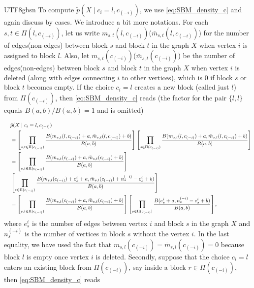 \documentclass[12pt]{report}
\newcommand\tab[1][1cm]{\hspace*{#1}}
\newcommand{\squared}[1]{\left [ #1 \right ]}
\theoremstyle{plain}
\theoremstyle{definition}
\begin{document}
\begin{CJK*}{UTF8}{gbsn}
To compute $\tilde{p}(X \mid c_i = l,c_{(-i)})$, we use 
\eqref{eq:SBM_density_c} and again discuss by cases.
We introduce a bit more notations. 
For each $s, t \in \Pi(l, c_{(-i)})$,
let us write $m_{s,t}(l, c_{(-i)})$($\bar{m}_{s,t}(l, c_{(-i)})$)
for the number of edges(non-edges) between block $s$ and block $t$ in the graph $X$ 
when vertex $i$ is assigned to block $l$.
Also, let $m_{s,t}(c_{(-i)})$($\bar{m}_{s,t}(c_{(-i)})$)
be the number of edges(non-edges) between block $s$ and block $t$
in the graph $X$ when vertex $i$ is deleted (along with edges connecting $i$ to other vertices),
which is $0$ if block $s$ or block $t$ becomes empty.
If the choice $c_i=l$ creates a new block (called just $l$) from $\Pi(c_{(-i)})$,
then \eqref{eq:SBM_density_c} reads (the factor for the pair $\{l, l\}$ equals $B(a,b)/B(a,b) = 1$ and is omitted)

\begin{equation*}
  \begin{split}
  \tab[0.4cm] & \tilde{p}(X \mid c_i = l,c_{(-i)}) \\ & = 
  \squared{\prod_{s, t \in \Pi(c_{(-i)})} 
  \frac{B(m_{s,t}(l,c_{(-i)})+a, \bar{m}_{s,t}(l,c_{(-i)})+b)}{B(a,b)}}
  \squared{\prod_{s \in \Pi(c_{(-i)})} 
  \frac{B(m_{s,l}(l, c_{(-i)})+a, \bar{m}_{s,l}(l, c_{(-i)})+b)}{B(a,b)}}
  \\ & =
  \squared{\prod_{s, t \in \Pi(c_{(-i)})} 
  \frac{B(m_{s,t}(c_{(-i)})+a, \bar{m}_{s,t}(c_{(-i)})+b)}{B(a,b)}}
  \\ & \squared{\prod_{s \in \Pi(c_{(-i)})}
  \frac{B(m_{s,l}(c_{(-i)})+e^i_s+a, \bar{m}_{s,l}(c_{(-i)})+n_s^{(-i)} - e^i_s+b)}{B(a,b)}}
  \\ & =
  \squared{\prod_{s, t \in \Pi(c_{(-i)})} 
  \frac{B(m_{s,t}(c_{(-i)})+a, \bar{m}_{s,t}(c_{(-i)})+b)}{B(a,b)}}
  \squared{\prod_{s \in \Pi(c_{(-i)})}
  \frac{B(e^i_s+a,n_s^{(-i)} - e^i_s+b)}{B(a,b)}},
  \end{split}
\end{equation*}
where $e^i_s$ is the number of edges between vertex $i$ and block $s$ in the graph $X$
and $n_s^{(-i)}$ is the number of vertices in block $s$ without the vertex $i$.
In the last equality, we have used the fact that $m_{s,l}(c_{(-i)}) = \bar{m}_{s,l}(c_{(-i)}) = 0$
because block $l$ is empty once vertex $i$ is deleted.
Secondly, suppose that the choice $c_i=l$ enters an existing block from $\Pi(c_{(-i)})$,
say inside a block $r \in \Pi(c_{(-i)})$, then \eqref{eq:SBM_density_c} reads


\end{CJK*}
\end{document}
